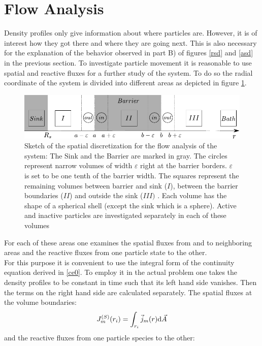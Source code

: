 \section{Flow Analysis}
\label{flow_analysis}
Density profiles only give information about where particles are. However, it is of interest how they got there and where they are going next. This is also necessary for the explanation of the behavior observed in part B) of figures \ref{rsd} and \ref{asd} in the previous section.
To investigate particle movement it is reasonable to use spatial and reactive fluxes for a further study of the system.
To do so the radial coordinate of the system is divided into different areas as depicted in figure \ref{fig:flowchart_scetch}.
\begin{figure}[H]
    \centering
    \includegraphics[width = .9 \textwidth]{plots/drawing.pdf}
    \caption{Sketch of the spatial discretization for the flow analysis of the system: The Sink and the Barrier are marked in gray. The circles represent narrow volumes of width $\varepsilon$ right at the barrier borders. $\varepsilon$ is set to be one tenth of the barrier width. The squares represent the remaining volumes between barrier and sink ($I$), between the barrier boundaries ($II$) and outside the sink ($III)$ . Each volume has the shape of a spherical shell (except the sink which is a sphere). Active and inactive particles are investigated separately in each of these volumes}
    \label{fig:flowchart_scetch}
\end{figure}
For each of these areas one examines the spatial fluxes from and to neighboring areas and the reactive fluxes from one particle state to the other. \\
For this purpose it is convenient to use the integral form of the continuity equation derived in \eqref{ce0}. To employ it in the actual problem one takes the density profiles to be constant in time such that its left hand side vanishes. Then the terms on the right hand side are calculated separately. The spatial fluxes at the volume boundaries:
\begin{equation}
    J_m^{(S)}(r_i) = \int_{r_i} \vec{j}_m(r) {\rm d} \vec{A}
    \label{spatial_flux}
\end{equation}
and the reactive fluxes from one particle species to the other:
